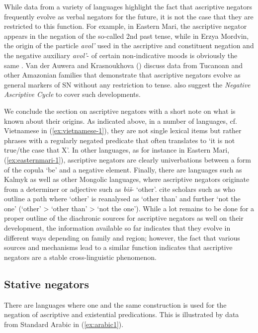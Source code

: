 \documentclass[output=paper,chinesefont,colorlinks,citecolor=brown]{langscibook}
\begin{document}
While data from a variety of languages highlight the fact that ascriptive negators frequently evolve as verbal negators for the future, it is not the case that they are restricted to this function. For example, in Eastern Mari, the ascriptive negator appears in the negation of the so-called 2nd past tense, while in Erzya Mordvin, the origin of the particle \textit{avol’} used in the ascriptive and constituent negation and the negative auxiliary \textit{avol’}- of certain non-indicative moods is obviously the same \citep[470--475]{Hamari2013, Hamari2011}. Van der Auwera and Krasnoukhova (\citeyear[109--110]{auwerakrasnoukhova2020}) discuss data from Tucanoan and other Amazonian families that demonstrate that ascriptive negators evolve as general markers of SN without any restriction to tense. \citet{KrasnoukhovaAuweraXXXX} also suggest the \textit{Negative Ascriptive Cycle} to cover such developments.

We conclude the section on ascriptive negators with a short note on what is known about their origins. As indicated above, in a number of languages, cf. Vietnamese in (\ref{ex:vietnamese-1}), they are not single lexical items but rather phrases with a regularly negated predicate that often translates to ‘it is not true/the case that X’. In other languages, as for instance in Eastern Mari, (\ref{ex:easternmari-1}), ascriptive negators are clearly univerbations between a form of the copula ‘be’ and a negative element. Finally, there are languages such as Kalmyk as well as other Mongolic languages, where ascriptive negators originate from a determiner or adjective such as \textit{biš}- ‘other’. 
cite scholars such as \citet[250--251]{janhunen2012a}
who outline a path where ‘other’ is reanalysed as ‘other than’ and further ‘not the one’ (‘other’ > ‘other than’ > ‘not the one’).  While a lot remains to be done for a proper outline of the diachronic sources for ascriptive negators as well on their development, the information available so far indicates that they evolve in different ways depending on family and region; however, the fact that various sources and mechanisms lead to a similar function indicates that ascriptive negators are a stable cross-linguistic phenomenon. 

\subsection{Stative negators}\label{section:stative-negators}\label{sec:intro:2.5}
There are  languages where one and the same construction is used for the negation of ascriptive and existential predications. This is illustrated by data from Standard Arabic in (\ref{ex:arabic1}).
\end{document}
